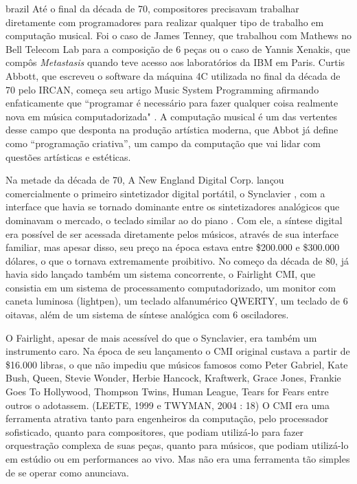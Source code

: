 \begin{otherlanguage*}{brazil}
Até o final da década de 70, compositores precisavam trabalhar diretamente com programadores para realizar qualquer tipo de trabalho em computação musical. Foi o caso de James Tenney, que trabalhou com Mathews no Bell Telecom Lab para a composição de 6 peças ou o caso de Yannis Xenakis, que compôs \emph{Metastasis} quando teve acesso aos laboratórios da IBM em Paris\cite{Holmes1985}. Curtis Abbott, que escreveu o software da máquina 4C utilizada no final da década de 70 pelo IRCAN, começa seu artigo Music System Programming afirmando enfaticamente que ``programar é necessário para fazer qualquer coisa realmente nova em música computadorizada" \cite[51]{Roads1996}. A computação musical é um das vertentes desse campo que desponta na produção artística moderna, que Abbot já define como ``programação criativa'', um campo da computação que vai lidar com questões artísticas e estéticas. 

Na metade da década de 70, A New England Digital Corp. lançou comercialmente o primeiro sintetizador digital portátil, o Synclavier \cite[265]{Holmes1985}, com a interface que havia se tornado dominante entre os sintetizadores analógicos que dominavam o mercado, o teclado similar ao do piano \cite{JosephParadiso1998}. Com ele, a síntese digital era possível de ser acessada diretamente pelos músicos, através de sua interface familiar, mas apesar disso, seu preço na época estava entre \$200.000 e \$300.000 dólares, o que o tornava extremamente proibitivo. No começo da década de 80, já havia sido lançado também um sistema concorrente, o Fairlight CMI, que consistia em um sistema de processamento computadorizado, um monitor com caneta luminosa (lightpen), um teclado alfanumérico QWERTY, um teclado de 6 oitavas, além de um sistema de síntese analógica com 6 osciladores.

O Fairlight, apesar de mais acessível do que o Synclavier, era também um instrumento caro. Na época de seu lançamento o CMI original custava a partir de \$16.000 libras, o que não impediu que músicos famosos como Peter Gabriel, Kate Bush, Queen, Stevie Wonder, Herbie Hancock, Kraftwerk, Grace Jones, Frankie Goes To Hollywood, Thompson Twins, Human League, Tears for Fears entre outros o adotassem. \cite[18]{Twyman2004}(LEETE, 1999 e TWYMAN, 2004 : 18) O CMI era uma ferramenta atrativa tanto para engenheiros da computação, pelo processador sofisticado, quanto para compositores, que podiam utilizá-lo para fazer orquestração complexa de suas peças, quanto para músicos, que podiam utilizá-lo em estúdio ou em performances ao vivo. Mas não era uma ferramenta tão simples de se operar como anunciava. \cite[55]{Twyman2004}


\end{otherlanguage*}
